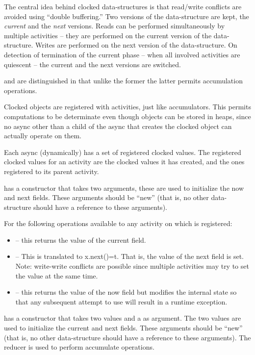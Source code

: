 The central idea behind clocked data-structures is that read/write
conflicts are avoided using ``double buffering.'' Two versions of the
data-structure are kept, the {\em current} and the {\em next}
versions. Reads can be performed simultaneously by multiple activities
-- they are performed on the current version of the
data-structure. Writes are performed on the next version of the
data-structure. On detection of termination of the current phase --
when all involved activities are quiescent -- the current and the next
versions are switched.

 and  are distinguished in that
unlike the former the latter permits accumulation operations.

Clocked objects are registered with activities, just like
accumulators.  This permits computations to be determinate even though
objects can be stored in heaps, since no async other than a child of
the async that creates the clocked object can actually operate on
them.

Each async (dynamically) has a set of registered clocked values. The
registered clocked values for an activity are the clocked values it
has created, and the ones registered to its parent activity.

  has a constructor that takes two  arguments, these are
used to initialize the now and next fields. These arguments should be
``new'' (that is, no other data-structure should have a reference to
these arguments).

For  the following operations available to any activity on which 
is registered:
\begin{itemize}
\item {} -- this returns the value of the current field.

\item {} -- This is translated to x.next()=t. That is, the
  value of the next field is set. Note:
     write-write conflicts are possible since multiple activities may
     try to set the value at the same time.
\item{} -- this returns the value of the now field
  but modifies the internal state so that any subsequent attempt to
  use  will result in a runtime exception.
\end{itemize}

 has a constructor that takes two  values and a
 as argument. The two  values are used to initialize the
current and next fields. These arguments should be ``new'' (that is, no
other data-structure should have a reference to these arguments). The
reducer is used to perform accumulate operations.

